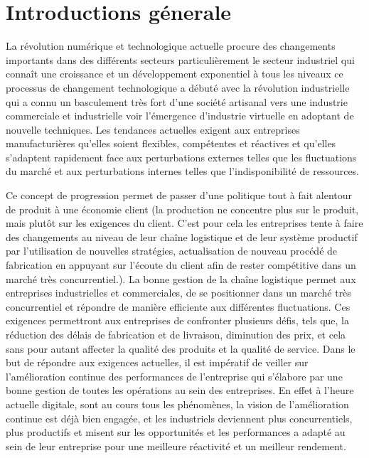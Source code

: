 \newpage
\chapter*{Introductions génerale}
La révolution numérique et technologique actuelle procure des changements importants dans des différents secteurs particulièrement le secteur industriel qui connaît une croissance et un développement exponentiel à tous les niveaux ce processus de changement technologique a débuté avec la révolution industrielle qui a connu un basculement très fort d’une société artisanal vers une industrie commerciale et industrielle voir l’émergence d’industrie virtuelle en adoptant de nouvelle techniques. Les tendances actuelles exigent aux entreprises manufacturières qu’elles soient flexibles, compétentes et réactives et qu’elles s’adaptent rapidement face aux perturbations externes telles que les fluctuations du marché et aux perturbations internes telles que l’indisponibilité de ressources. 

Ce concept de progression permet de passer d’une politique tout à fait alentour de produit à une économie client (la production ne concentre plus sur le produit, mais plutôt sur les exigences du client.  C'est pour cela les entreprises tente à faire des changements au niveau de leur chaîne logistique et de leur système productif par l’utilisation de nouvelles stratégies, actualisation de nouveau procédé de fabrication en appuyant sur l’écoute du client afin de rester compétitive dans un marché très concurrentiel.). La bonne gestion de la chaîne logistique permet aux entreprises industrielles et commerciales, de se positionner dans un marché très concurrentiel et répondre de manière efficiente aux différentes fluctuations. Ces exigences permettront aux entreprises de confronter plusieurs défis, tels que, la réduction des délais de fabrication et de livraison, diminution des prix, et cela sans pour autant affecter la qualité des produits et la qualité de service. Dans le but de répondre aux exigences actuelles, il est impératif de veiller sur l’amélioration continue des performances de l’entreprise qui s’élabore par une bonne gestion de toutes les opérations au sein des entreprises. En effet à l’heure actuelle digitale, sont au cours tous les phénomènes, la vision de l’amélioration continue est déjà bien engagée, et les industriels deviennent plus concurrentiels, plus productifs et misent sur les opportunités et les performances a adapté au sein de leur entreprise pour une meilleure réactivité et un meilleur rendement.

